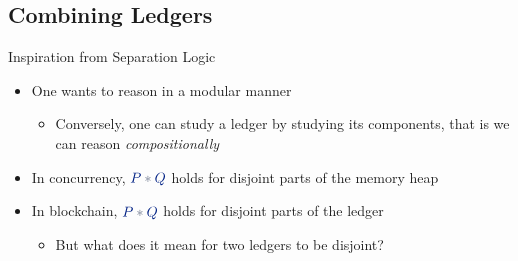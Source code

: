 \documentclass[aspectratio=43]{beamer}
\newcommand*{\mathcolor}{}
\def\mathcolor#1#{\mathcoloraux{#1}}
\newcommand*{\mathcoloraux}[3]{%
  \protect\leavevmode
  \begingroup
    \color#1{#2}#3%
  \endgroup
}
\newcommand{\HSSym}[1]{\mathcolor{hsblue4}{\ensuremath{#1}}}
\newcommand{\HSCon}[1]{\mathcolor{hsblue3}{#1}}
\begin{document}
\subsection{Combining Ledgers}

\begin{frame}{Inspiration from Separation Logic}
\begin{itemize}
\item One wants to reason in a modular manner
  \begin{itemize}
  \item Conversely, one can study a ledger by studying its components, that is we can reason \textit{compositionally}
  \end{itemize}
\item In concurrency, \ensuremath{\HSCon{P}\HSSym{\ast}\HSCon{Q}} holds for disjoint parts of the memory heap
\item In blockchain, \ensuremath{\HSCon{P}\HSSym{\ast}\HSCon{Q}} holds for disjoint parts of the ledger
  \begin{itemize}
  \item But what does it mean for two ledgers to be disjoint?
  \end{itemize}
\end{itemize}
\end{frame}
\end{document}
